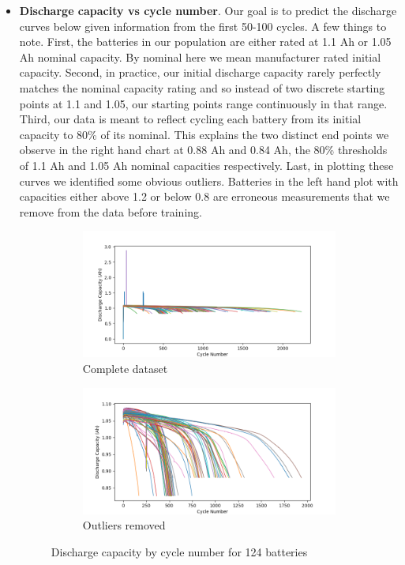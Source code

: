 \documentclass{article}
\begin{document}
\begin{itemize}
    \item \textbf{Discharge capacity vs cycle number}. Our goal is to predict the discharge curves below given information from the first 50-100 cycles. A few things to note. First, the batteries in our population are either rated at 1.1 Ah or 1.05 Ah nominal capacity. By nominal here we mean manufacturer rated initial capacity. Second, in practice, our initial discharge capacity rarely perfectly matches the nominal capacity rating and so instead of two discrete starting points at 1.1 and 1.05, our starting points range continuously in that range. Third, our data is meant to reflect cycling each battery from its initial capacity to 80\% of its nominal. This explains the two distinct end points we observe in the right hand chart at 0.88 Ah and 0.84 Ah, the 80\% thresholds of 1.1 Ah and 1.05 Ah nominal capacities respectively. Last, in plotting these curves we identified some obvious outliers. Batteries in the left hand plot with capacities either above 1.2 or below 0.8 are erroneous measurements that we remove from the data before training.  

        \begin{figure}[H]
            \centering
            \begin{subfigure}[b]{0.49\linewidth}
                \includegraphics[width=\linewidth]{figs/discharge_capacity_by_cycle.png}
                \caption{Complete dataset}
            \end{subfigure}
            \begin{subfigure}[b]{0.49\linewidth}
                \includegraphics[width=\linewidth]{figs/discharge_capacity_by_cycle_remove_outliers.png}
                \caption{Outliers removed}
            \end{subfigure}
            \caption{Discharge capacity by cycle number for 124 batteries}
            \label{fig:3a}
        \end{figure}


\end{itemize}
\end{document}
